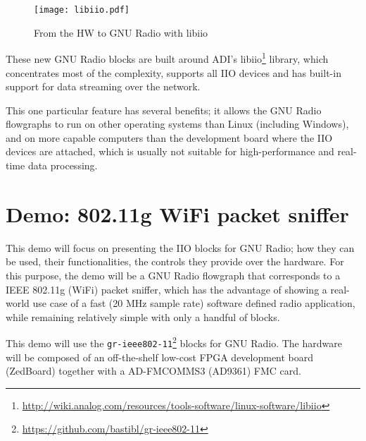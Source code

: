 \documentclass{acm_proc_article-sp}
\begin{document}
\begin{figure}[htbp]
\centering
\texttt{[image: libiio.pdf]}
\caption{From the HW to GNU Radio with libiio}
\end{figure}

These new GNU Radio blocks are built around ADI's
libiio\footnote{\url{http://wiki.analog.com/resources/tools-software/linux-software/libiio}}
library, which concentrates most of the complexity,
supports all IIO devices and has built-in support
for data streaming over the network.

This one particular feature
has several benefits; it allows the GNU Radio flowgraphs to run
on other operating systems than Linux (including Windows),
and on more capable computers than the development board
where the IIO devices are attached, which is usually not
suitable for high-performance and real-time data processing.

\section{Demo: 802.11g WiFi packet sniffer}

This demo will focus on presenting the IIO blocks for GNU Radio; how they can be
used, their functionalities, the controls they provide over the hardware.
For this purpose, the demo will be a GNU Radio flowgraph that corresponds to a
IEEE 802.11g (WiFi) packet sniffer, which has the advantage of showing a
real-world use case of a fast (20 MHz sample rate) software defined radio
application, while remaining relatively simple with only a handful of blocks.

This demo will use the
\texttt{gr-ieee802-11}\footnote{\url{https://github.com/bastibl/gr-ieee802-11}}
blocks for GNU Radio. The hardware will be composed of an off-the-shelf low-cost
FPGA development board (ZedBoard) together with a AD-FMCOMMS3 (AD9361) FMC card.

\balancecolumns
\end{document}
